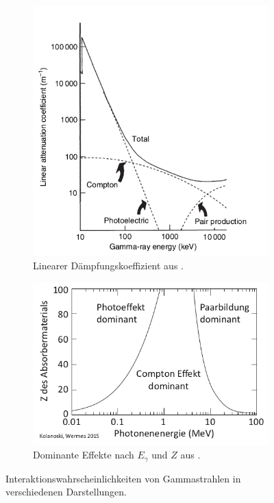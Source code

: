 \begin{figure}
	\centering
	\begin{subfigure}{.5\textwidth}
		\centering
		\includegraphics[width=0.9\linewidth]{./Bilder/E_mu_Gilmore.png}%
		\caption{Linearer Dämpfungskoeffizient aus \cite{book:gil}.}\label{fig:mu}
	\end{subfigure}%
	\begin{subfigure}{.5\textwidth}
		\centering
		\includegraphics[width=0.9\linewidth]{./Bilder/E_Z_Kolanoski.png}
		\caption{Dominante Effekte nach $E_\gamma$ und $Z$ aus \cite{book:kolano}.}\label{fig:z}
	\end{subfigure}
	\caption{Interaktionswahrscheinlichkeiten von Gammastrahlen in verschiedenen Darstellungen.}\label{}
\end{figure}

